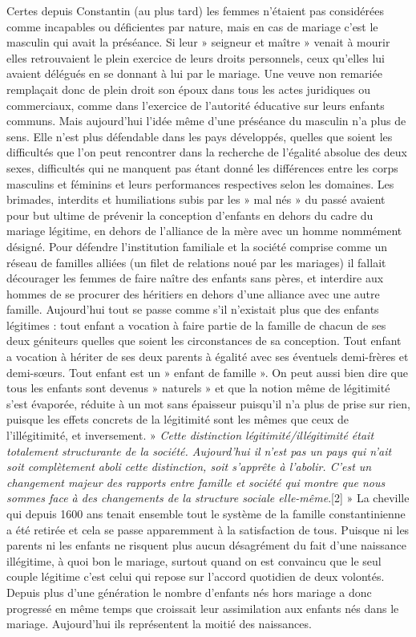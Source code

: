  Certes depuis Constantin (au plus tard) les femmes n'étaient pas considérées comme incapables ou déficientes par nature, mais en cas de mariage c'est le masculin qui avait la préséance. Si leur » seigneur et maître » venait à mourir elles retrouvaient le plein exercice de leurs droits personnels, ceux qu'elles lui avaient délégués en se donnant à lui par le mariage. Une veuve non remariée remplaçait donc de plein droit son époux dans tous les actes juridiques ou commerciaux, comme dans l'exercice de l'autorité éducative sur leurs enfants communs. Mais aujourd'hui l'idée même d'une préséance du masculin n'a plus de sens. Elle n'est plus défendable dans les pays développés, quelles que soient les difficultés que l'on peut rencontrer dans la recherche de l'égalité absolue des deux sexes, difficultés qui ne manquent pas étant donné les différences entre les corps masculins et féminins et leurs performances respectives selon les domaines.
 Les brimades, interdits et humiliations subis par les » mal nés » du passé avaient pour but ultime de prévenir la conception d'enfants en dehors du cadre du mariage légitime, en dehors de l'alliance de la mère avec un homme nommément désigné. Pour défendre l'institution familiale et la société comprise comme un réseau de familles alliées (un filet de relations noué par les mariages) il fallait décourager les femmes de faire naître des enfants sans pères, et interdire aux hommes de se procurer des héritiers en dehors d'une alliance avec une autre famille. Aujourd'hui tout se passe comme s'il n'existait plus que des enfants légitimes : tout enfant a vocation à faire partie de la famille de chacun de ses deux géniteurs quelles que soient les circonstances de sa conception. Tout enfant a vocation à hériter de ses deux parents à égalité avec ses éventuels demi-frères et demi-sœurs. Tout enfant est un » enfant de famille ». On peut aussi bien dire que tous les enfants sont devenus » naturels » et que la notion même de légitimité s'est évaporée, réduite à un mot sans épaisseur puisqu'il n'a plus de prise sur rien, puisque les effets concrets de la légitimité sont les mêmes que ceux de l'illégitimité, et inversement. 
 » \emph{Cette distinction légitimité/illégitimité était totalement structurante de la société. Aujourd'hui il n'est pas un pays qui n'ait soit complètement aboli cette distinction, soit s'apprête à l'abolir. C'est un changement majeur des rapports entre famille et société qui montre que nous sommes face à des changements de la structure sociale elle-même}.[2] » 
 La cheville qui depuis 1600 ans tenait ensemble tout le système de la famille constantinienne a été retirée et cela se passe apparemment à la satisfaction de tous. Puisque ni les parents ni les enfants ne risquent plus aucun désagrément du fait d'une naissance illégitime, à quoi bon le mariage, surtout quand on est convaincu que le seul couple légitime c'est celui qui repose sur l'accord quotidien de deux volontés. Depuis plus d'une génération le nombre d'enfants nés hors mariage a donc progressé en même temps que croissait leur assimilation aux enfants nés dans le mariage. Aujourd'hui ils représentent la moitié des naissances. 
